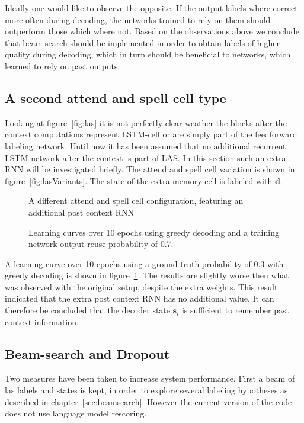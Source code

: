 Ideally one would like to observe the opposite. If the output labels where correct more often during decoding, the networks trained to rely on them should outperform those which where not. Based on the observations above we conclude that beam search should be implemented in order to obtain labels of higher quality during decoding, which in turn should be beneficial to networks, which learned to rely on past outputs.


\subsection{A second attend and spell cell type}
Looking at figure~\ref{fig:las} it is not perfectly clear weather the blocks after the context computations represent LSTM-cell or are simply part of the feedforward labeling network. Until now it has been assumed that no additional recurrent LSTM network after the context is part of LAS. In this section such an extra RNN will be investigated briefly. The attend and spell cell variation is shown in figure~\ref{fig:lasVariants}. The state of the extra memory cell is labeled with $\mathbf{d}$.
\begin{figure}
\centering

\caption{A different attend and spell cell configuration, featuring an additional post context RNN}
\label{fig:lasVariants}

\caption{Learning curves over 10 epochs using greedy decoding and a training network output reuse probability of 0.7.}
\label{fig:variantResult}
\end{figure}
A learning curve over 10 epochs using a ground-truth probability of 0.3 with greedy decoding is shown in figure~\ref{fig:variantResult}. The results are slightly worse then what was observed with the original setup, despite the extra weights. This result indicated that the extra post context RNN has no additional value.
It can therefore be concluded that the decoder state $\mathbf{s}_i$ is sufficient to remember past context information.

\subsection{Beam-search and Dropout}
Two measures have been taken to increase system performance. First a beam of las labels and states is kept, in order to explore several labeling hypotheses as described in chapter~\ref{sec:beamsearch}. However the current version of the code does not use language model rescoring.

